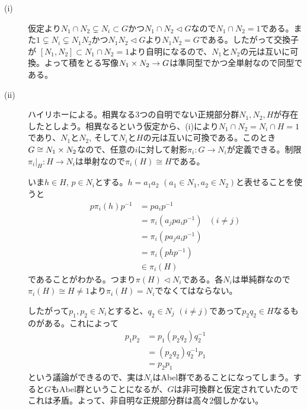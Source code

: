 \begin{sol} ${}$
  \begin{description}
    \item[(i)] 仮定より$N_1 \cap N_2 \subsetneq N_i \subset G$かつ$N_1 \cap N_2 \lhd G$なので$N_1 \cap N_2 = 1$である。また$1 \subsetneq N_i \subsetneq N_1 N_2 $かつ$N_1 N_2 \lhd G$より$N_1 N_2 = G$である。したがって交換子が
    $[N_1,N_2] \subset N_1 \cap N_2 = 1$より自明になるので、$N_1$と$N_2$の元は互いに可換。よって積をとる写像$N_1 \times N_2 \to G$は準同型でかつ全単射なので同型である。
    \item[(ii)] ハイリホーによる。相異なる$3$つの自明でない正規部分群$N_1, N_2, H$が存在したとしよう。相異なるという仮定から、(i)により$N_1 \cap N_2 = N_i \cap H = 1$であり、$N_1$と$N_2$, そして$N_i$と$H$の元は互いに可換である。このとき$G \cong N_1 \times N_2$なので、任意の$i$に対して射影$\pi_i \colon G \to N_i$が定義できる。制限$\pi_i |_H \colon H \to N_i$は単射なので$\pi_i(H) \cong H$である。

    いま$h \in H$, $p \in N_i$とする。$h = a_1 a_2$ $(a_1 \in N_1, a_2 \in N_2)$と表せることを使うと
    \begin{align*}
      p \pi_i(h) p^{-1} &= p a_i p^{-1} \\
      &= \pi_i(a_{j} p a_i p^{-1}  )  &(i \neq j) \\
      &= \pi_i( p a_j a_i p^{-1}) \\
      &= \pi_i(p h p^{-1}) \\
      &\in \pi_i(H)
    \end{align*}
    であることがわかる。つまり$\pi(H) \lhd N_i$である。各$N_i$は単純群なので$\pi_i(H) \cong H \neq 1$より$\pi_i(H) = N_i$でなくてはならない。

    したがって$p_1, p_2 \in N_i$とすると、$q_2 \in N_j $ $(i \neq j)$であって$p_2 q_2 \in H$なるものがある。これによって
    \begin{align*}
      p_1 p_2 &= p_1 (p_2 q_2) q_2^{-1} \\
      &= (p_2 q_2) q_2^{-1} p_1 \\
      &= p_2 p_1
    \end{align*}
    という議論ができるので、実は$N_i$はAbel群であることになってしまう。すると$G$もAbel群ということになるが、$G$は非可換群と仮定されていたのでこれは矛盾。よって、非自明な正規部分群は高々$2$個しかない。
  \end{description}
\end{sol}
